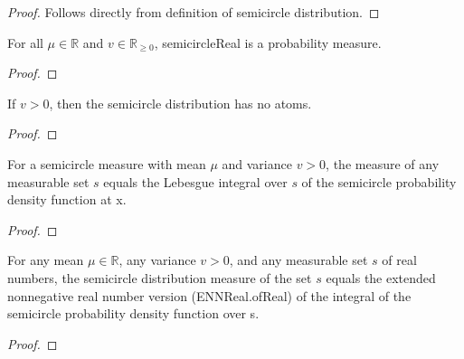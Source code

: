 \begin{proof}
  \leanok
  Follows directly from definition of semicircle distribution.
\end{proof}

\begin{lemma} %
  \label{lem:instIsProbabilityMeasuresemicircleReal}
  \leanok

  For all $\mu \in \mathbb{R}$ and $v \in \mathbb{R}_{\ge 0}$, semicircleReal is a probability measure.
\end{lemma}

\begin{proof}
  \leanok
\end{proof}

\begin{lemma}
  \label{lem:noAtoms_semicircleReal}
  \leanok
  If $v > 0$, then the semicircle distribution has no atoms.
\end{lemma}

\begin{proof}
  \leanok
\end{proof}

\begin{lemma}
  \label{lem:semicircleReal_apply}
  \leanok
  For a semicircle measure with mean $\mu$ and variance $v > 0$, the measure of any measurable set $s$ equals the Lebesgue integral over $s$ of the semicircle probability density function at x.
\end{lemma}

\begin{proof}
  \leanok
\end{proof}

\begin{lemma}
  \label{lem:semicircleReal_apply_eq_integral}
  \leanok
  For any mean $\mu \in \mathbb{R}$, any variance $v > 0$, and any measurable set $s$ of real numbers, the semicircle distribution measure of the set $s$ equals the extended nonnegative real number version (ENNReal.ofReal) of the integral of the semicircle probability density function over s.
\end{lemma}

\begin{proof}
  \leanok
\end{proof}

